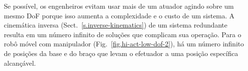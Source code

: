 
Se possível, os engenheiros evitam usar mais de um atuador agindo sobre um mesmo DoF porque isso aumenta a complexidade e o custo de um sistema. A cinemática inversa (Sect.~\ref{s.inverse-kinematics}) de um sistema redundante resulta em um número infinito de soluções que complicam sua operação. Para o robô móvel com manipulador (Fig.~\ref{fig.hi-act-low-dof-2}), há um número infinito de posições da base e do braço que levam o efetuador a uma posição específica alcançável.


